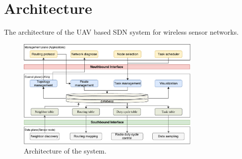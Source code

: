 \section{Architecture}

The architecture of the UAV based SDN system for wireless sensor networks.

\begin{figure}[htbp]
	\centering
	\includegraphics[width=3.5in]{./Figure/Architecture}
	\caption{Architecture of the system.}
	\label{Architecture}
\end{figure}




